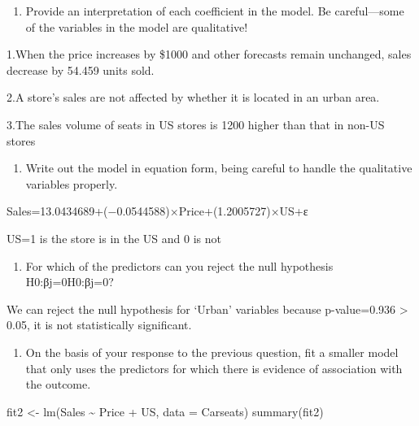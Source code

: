 \documentclass[
]{article}
\newenvironment{Shaded}{\begin{snugshade}}{\end{snugshade}}
\newcommand{\AttributeTok}[1]{\textcolor[rgb]{0.77,0.63,0.00}{#1}}
\newcommand{\FunctionTok}[1]{\textcolor[rgb]{0.00,0.00,0.00}{#1}}
\newcommand{\NormalTok}[1]{#1}
\newcommand{\OtherTok}[1]{\textcolor[rgb]{0.56,0.35,0.01}{#1}}
\newcommand{\SpecialCharTok}[1]{\textcolor[rgb]{0.00,0.00,0.00}{#1}}
\providecommand{\tightlist}{%
  \setlength{\itemsep}{0pt}\setlength{\parskip}{0pt}}
\begin{document}
\begin{enumerate}
\def\labelenumi{(\alph{enumi})}
\setcounter{enumi}{1}
\tightlist
\item
  Provide an interpretation of each coefficient in the model. Be
  careful---some of the variables in the model are qualitative!
\end{enumerate}

1.When the price increases by \$1000 and other forecasts remain
unchanged, sales decrease by 54.459 units sold.

2.A store's sales are not affected by whether it is located in an urban
area.

3.The sales volume of seats in US stores is 1200 higher than that in
non-US stores

\begin{enumerate}
\def\labelenumi{(\alph{enumi})}
\setcounter{enumi}{2}
\tightlist
\item
  Write out the model in equation form, being careful to handle the
  qualitative variables properly.
\end{enumerate}

Sales=13.0434689+(−0.0544588)×Price+(1.2005727)×US+ε

US=1 is the store is in the US and 0 is not

\begin{enumerate}
\def\labelenumi{(\alph{enumi})}
\setcounter{enumi}{3}
\tightlist
\item
  For which of the predictors can you reject the null hypothesis
  H0:βj=0H0:βj=0?
\end{enumerate}

We can reject the null hypothesis for `Urban' variables because
p-value=0.936 \textgreater{} 0.05, it is not statistically significant.

\begin{enumerate}
\def\labelenumi{(\alph{enumi})}
\setcounter{enumi}{4}
\tightlist
\item
  On the basis of your response to the previous question, fit a smaller
  model that only uses the predictors for which there is evidence of
  association with the outcome.
\end{enumerate}

\begin{Shaded}
\begin{Highlighting}[]
\NormalTok{fit2 }\OtherTok{\textless{}{-}} \FunctionTok{lm}\NormalTok{(Sales }\SpecialCharTok{\textasciitilde{}}\NormalTok{ Price }\SpecialCharTok{+}\NormalTok{ US, }\AttributeTok{data =}\NormalTok{ Carseats)}
\FunctionTok{summary}\NormalTok{(fit2)}
\end{Highlighting}
\end{Shaded}
\end{document}
